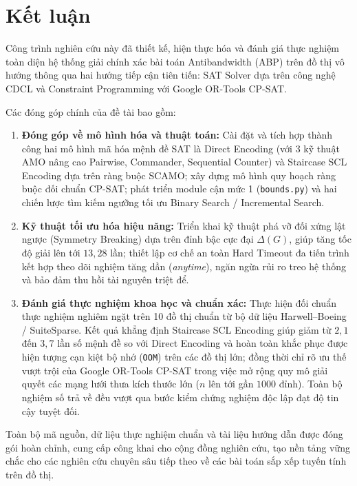 \documentclass[a4paper,fleqn]{cas-sc}
\begin{document}
\section{Kết luận}
\label{sec:conclusion}

Công trình nghiên cứu này đã thiết kế, hiện thực hóa và đánh giá thực nghiệm toàn diện hệ thống giải chính xác bài toán Antibandwidth (ABP) trên đồ thị vô hướng thông qua hai hướng tiếp cận tiên tiến: SAT Solver dựa trên công nghệ CDCL và Constraint Programming với Google OR-Tools CP-SAT.

Các đóng góp chính của đề tài bao gồm:
\begin{enumerate}
    \item \textbf{Đóng góp về mô hình hóa và thuật toán:} Cài đặt và tích hợp thành công hai mô hình mã hóa mệnh đề SAT là Direct Encoding (với 3 kỹ thuật AMO nâng cao Pairwise, Commander, Sequential Counter) và Staircase SCL Encoding dựa trên ràng buộc SCAMO; xây dựng mô hình quy hoạch ràng buộc đối chuẩn CP-SAT; phát triển module cận mức 1 (\texttt{bounds.py}) và hai chiến lược tìm kiếm ngưỡng tối ưu Binary Search / Incremental Search.
    \item \textbf{Kỹ thuật tối ưu hóa hiệu năng:} Triển khai kỹ thuật phá vỡ đối xứng lật ngược (Symmetry Breaking) dựa trên đỉnh bậc cực đại $\Delta(G)$, giúp tăng tốc độ giải lên tới $13{,}28$ lần; thiết lập cơ chế an toàn Hard Timeout đa tiến trình kết hợp theo dõi nghiệm tăng dần (\textit{anytime}), ngăn ngừa rủi ro treo hệ thống và bảo đảm thu hồi tài nguyên triệt để.
    \item \textbf{Đánh giá thực nghiệm khoa học và chuẩn xác:} Thực hiện đối chuẩn thực nghiệm nghiêm ngặt trên 10 đồ thị chuẩn từ bộ dữ liệu Harwell--Boeing / SuiteSparse. Kết quả khẳng định Staircase SCL Encoding giúp giảm từ $2{,}1$ đến $3{,}7$ lần số mệnh đề so với Direct Encoding và hoàn toàn khắc phục được hiện tượng cạn kiệt bộ nhớ (\texttt{OOM}) trên các đồ thị lớn; đồng thời chỉ rõ ưu thế vượt trội của Google OR-Tools CP-SAT trong việc mở rộng quy mô giải quyết các mạng lưới thưa kích thước lớn ($n$ lên tới gần $1000$ đỉnh). Toàn bộ nghiệm số trả về đều vượt qua bước kiểm chứng nghiệm độc lập đạt độ tin cậy tuyệt đối.
\end{enumerate}

Toàn bộ mã nguồn, dữ liệu thực nghiệm chuẩn và tài liệu hướng dẫn được đóng gói hoàn chỉnh, cung cấp công khai cho cộng đồng nghiên cứu, tạo nền tảng vững chắc cho các nghiên cứu chuyên sâu tiếp theo về các bài toán sắp xếp tuyến tính trên đồ thị.
\end{document}
